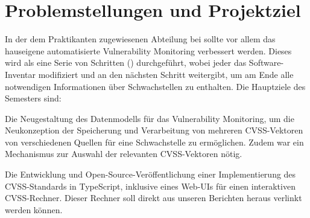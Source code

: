 \section{Problemstellungen und Projektziel} \label{sec:projektbericht-projektziel}

In der dem Praktikanten zugewiesenen Abteilung bei {\metaeffekt} sollte vor allem das hauseigene automatisierte Vulnerability Monitoring verbessert werden.
Dieses wird als eine Serie von Schritten () durchgeführt, wobei jeder das Software-Inventar modifiziert und an den nächsten Schritt weitergibt, um am Ende alle notwendigen Informationen über Schwachstellen zu enthalten.
Die Hauptziele des Semesters sind:

\begin{smitemize}
    \item Die Neugestaltung des Datenmodells für das Vulnerability Monitoring, um die Neukonzeption der Speicherung und Verarbeitung von mehreren CVSS-Vektoren von verschiedenen Quellen für eine Schwachstelle zu ermöglichen.
    Zudem war ein Mechanismus zur Auswahl der relevanten CVSS-Vektoren nötig.
    \item Die Entwicklung und Open-Source-Veröffentlichung einer Implementierung des CVSS-Standards in TypeScript, inklusive eines Web-UIs für einen interaktiven CVSS-Rechner.
    Dieser Rechner soll direkt aus unseren Berichten heraus verlinkt werden können.
\end{smitemize}
